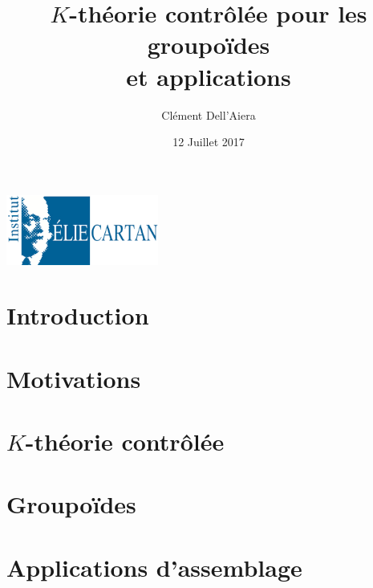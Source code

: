 \documentclass{beamer}
\title[First Steps with SCRATCH]{$K$-théorie contrôlée pour les groupoïdes\\ et applications}
\author{Clément Dell'Aiera}
\institute{IECL}
\date{12 Juillet 2017}
\begin{document}
\begin{frame}
  \titlepage
\begin{center}\includegraphics[width=5cm]{IECL.png}\end{center}
\end{frame}

\begin{frame}
  \tableofcontents
\end{frame}

\section{Introduction}


\section{Motivations}
\begin{frame}
  \tableofcontents[currentsection]
\end{frame}


\section{$K$-théorie contrôlée}
\begin{frame}
  \tableofcontents[currentsection]
\end{frame}


%

\section{Groupoïdes}
\begin{frame}
  \tableofcontents[currentsection]
\end{frame}



\section{Applications d'assemblage}
\begin{frame}
  \tableofcontents[currentsection]
\end{frame}

\end{document}
